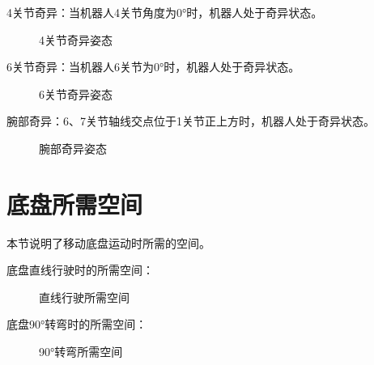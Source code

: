 \documentclass[a4paper,11pt,english,openany,oneside]{sphinxmanual}
\begin{document}
\sphinxAtStartPar
4关节奇异：当机器人4关节角度为0°时，机器人处于奇异状态。

\begin{figure}[H]
\centering
\capstart

\noindent{}
\caption{4关节奇异姿态}\label{\detokenize{07 _u6280_u672f_u89c4_u683c:id85}}\end{figure}



\sphinxAtStartPar
6关节奇异：当机器人6关节为0°时，机器人处于奇异状态。

\begin{figure}[H]
\centering
\capstart

\noindent{}
\caption{6关节奇异姿态}\label{\detokenize{07 _u6280_u672f_u89c4_u683c:id86}}\end{figure}



\sphinxAtStartPar
腕部奇异：6、7关节轴线交点位于1关节正上方时，机器人处于奇异状态。

\begin{figure}[H]
\centering
\capstart

\noindent{}
\caption{腕部奇异姿态}\label{\detokenize{07 _u6280_u672f_u89c4_u683c:id87}}\end{figure}




\section{底盘所需空间}
\label{\detokenize{07 _u6280_u672f_u89c4_u683c:id49}}\label{\detokenize{07 _u6280_u672f_u89c4_u683c:id50}}
\sphinxAtStartPar
本节说明了移动底盘运动时所需的空间。

\sphinxAtStartPar
底盘直线行驶时的所需空间：

\begin{figure}[H]
\centering
\capstart

\noindent{}
\caption{直线行驶所需空间}\label{\detokenize{07 _u6280_u672f_u89c4_u683c:id88}}\end{figure}



\sphinxAtStartPar
底盘90°转弯时的所需空间：

\begin{figure}[H]
\centering
\capstart

\noindent{}
\caption{90°转弯所需空间}\label{\detokenize{07 _u6280_u672f_u89c4_u683c:id89}}\end{figure}
\end{document}
